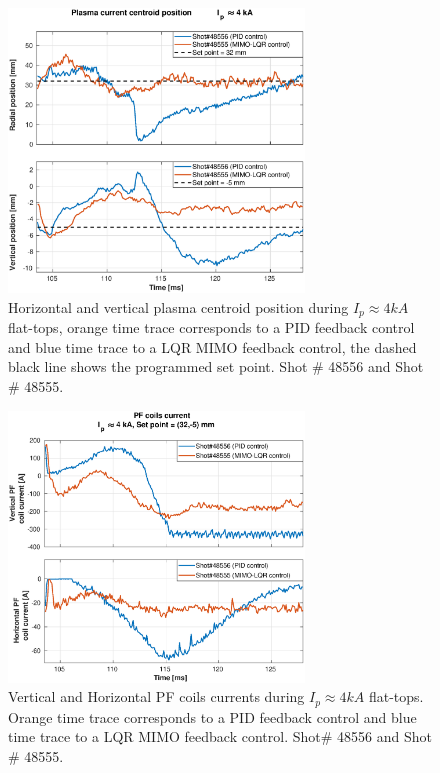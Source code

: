 \begin{figure}
	\centering
	\includegraphics[width=0.7\textwidth]{Chp5/PIDvsMIMO_556_555_2.eps}
	\caption{Horizontal and vertical plasma centroid position during  $I_p\approx 4kA$  flat-tops, orange time trace corresponds to a PID feedback control and blue time trace to a LQR MIMO feedback control, the dashed black line shows the programmed set point. Shot $\#$ 48556 and Shot $\#$ 48555.}
\end{figure}

\begin{figure}
	\centering
	\includegraphics[width=0.7\textwidth]{Chp5/PIDvsMIMO_556_555_curr_2.eps}
	\caption{  Vertical and Horizontal PF coils currents during  $I_p\approx 4kA$  flat-tops. Orange time trace corresponds to a PID feedback control and blue time trace to a LQR MIMO feedback control.  Shot$\#$ 48556 and Shot$\#$ 48555.}
\end{figure}

